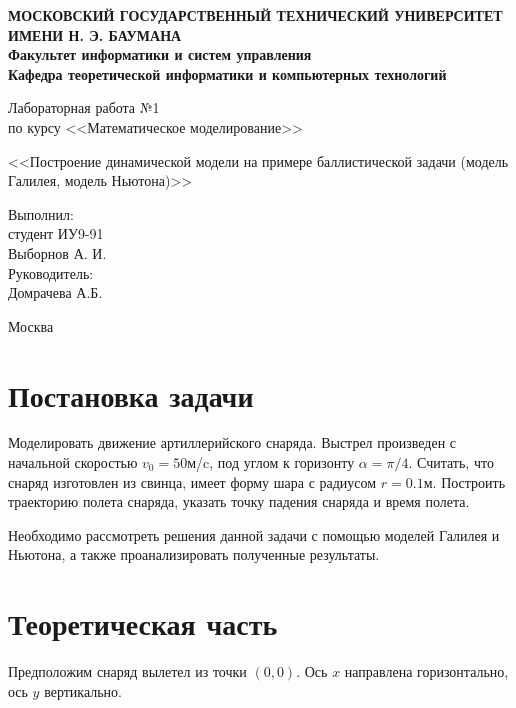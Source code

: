 \documentclass[12pt,a4paper,oneside]{extarticle}
\begin{document}
\pgfplotsset{compat=1.8}

\thispagestyle{empty}
\newpage
{
\centering


\textbf{
МОСКОВСКИЙ ГОСУДАРСТВЕННЫЙ ТЕХНИЧЕСКИЙ УНИВЕРСИТЕТ ИМЕНИ Н. Э. БАУМАНА \\
Факультет информатики и систем управления \\
Кафедра теоретической информатики и компьютерных технологий}
\bigskip
\bigskip
\bigskip
\bigskip
\bigskip
\bigskip
\bigskip

\vfill


Лабораторная работа №1 \\
по курсу <<Математическое моделирование>>

\bigskip

{\large <<Построение динамической модели на примере баллистической задачи (модель Галилея, модель Ньютона)>>}
\bigskip

\vfill



\hfill\parbox{4cm} {
Выполнил:\\
студент ИУ9-91 \hfill \\
Выборнов А. И.\hfill \medskip\\
Руководитель:\\
Домрачева А.Б.\hfill
}


\vspace{\fill}

Москва \number\year
\clearpage
}



\clearpage


\section{Постановка задачи}
    Моделировать движение артиллерийского снаряда. Выстрел произведен с начальной скоростью $v_0=50$м/c, под углом к горизонту $\alpha=\pi/4$. Считать, что снаряд изготовлен из свинца,  имеет форму шара с радиусом  $r=0.1$м. Построить траекторию полета снаряда, указать точку падения снаряда и время полета.

    Необходимо рассмотреть решения данной задачи с помощью моделей Галилея и Ньютона, а также проанализировать полученные результаты.

\section{Теоретическая часть}
    Предположим снаряд вылетел из точки $(0,0)$. Ось $x$ направлена горизонтально, ось $y$ вертикально.
\end{document}
